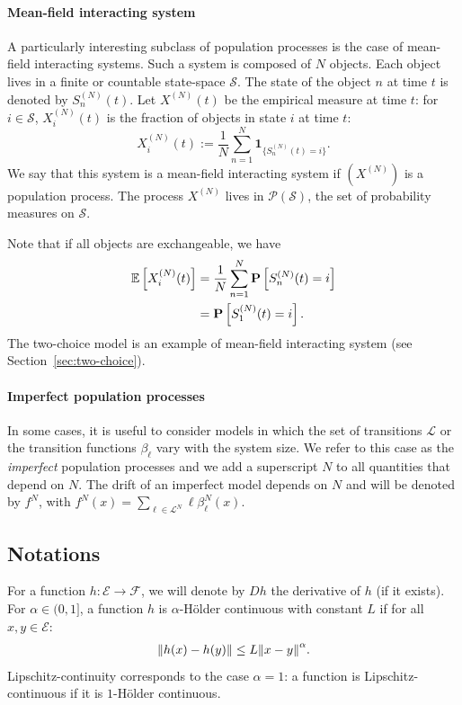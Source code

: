 \documentclass[sigconf]{acmart}
\newcommand\SN{S^{(N)}}
\newcommand\XN{X^{(N)}}
\newcommand\E{\mathcal{E}}
\newcommand\calL{\mathcal{L}}
\newcommand\calF{\mathcal{F}}
\newcommand\calP{\mathcal{P}}
\newcommand\calS{\mathcal{S}}
\newcommand\esp[1]{{\mathchoice{\besp{#1}}{\sesp{#1}}{\sesp{#1}}{\sesp{#1}}}}
\newcommand\besp[1]{\mathbb{E}\left[#1\right]}
\newcommand\sesp[1]{\mathbb{E}[#1]}
\newcommand\Proba[1]{\mathbf{P}\left[#1\right]}
\newcommand\norm[1]{{\mathchoice{\bnorm{#1}}{\snorm{#1}}{\snorm{#1}}{\snorm{#1}}}}
\newcommand\bnorm[1]{\left\|#1\right\|}
\newcommand\snorm[1]{\|#1\|}
\newcommand\Ind[1]{\mathbf{1}_{\{#1\}}}
\begin{document}
\paragraph*{Mean-field interacting system}
A particularly interesting subclass of population processes is the
case of mean-field interacting systems. Such a system is composed of $N$
objects. Each object lives in a finite or countable state-space
$\calS$. The state of the object $n$ at time $t$ is denoted by
$\SN_n(t)$. Let $\XN(t)$ be the empirical measure at time $t$: for
$i\in\calS$, $\XN_i(t)$ is the fraction of objects in state $i$ at
time $t$:
\begin{equation*}
  \XN_i(t) := \frac{1}{N}\sum_{n=1}^N \Ind{\SN_n(t)=i}.
\end{equation*}
We say that this system is a mean-field interacting system if $(\XN)$
is a population process.  The process $\XN$ lives in $\calP(\calS)$,
the set of probability measures on $\calS$.

Note that if all objects are exchangeable, we have
\begin{align}
  \esp{\XN_i(t)} &= \frac{1}{N} \sum_{n=1}^N \Proba{\SN_n(t)=i}\nonumber\\
  &=\Proba{\SN_1(t)=i}. \label{eq:symmetric}
\end{align}
The two-choice model is an example of mean-field interacting system
(see Section~\ref{sec:two-choice}).

\paragraph*{Imperfect population processes}

In some cases, it is useful to consider models in which the set of
transitions $\calL$ or the transition functions $\beta_\ell$ vary with
the system size. We refer to this case as the \emph{imperfect}
population processes and we add a superscript $N$ to all quantities
that depend on $N$. The drift of an imperfect model depends on $N$ and
will be denoted by $f^N$, with
$f^N(x) = \sum_{\ell\in\calL^N}\ell\beta^N_{\ell}(x)$. 



\subsection{Notations}


For a function $h:\E\to\calF$, we will denote by $Dh$ the derivative
of $h$ (if it exists). For $\alpha\in(0,1]$, a function $h$ is
$\alpha$-Hölder continuous with constant $L$ if for all $x,y\in\E$:
\begin{align*}
  \norm{h(x)-h(y)}\le L\norm{x-y}^\alpha. 
\end{align*} 
Lipschitz-continuity corresponds to the case $\alpha=1$: a function is
Lipschitz-continuous if it is $1$-Hölder continuous.
\end{document}
